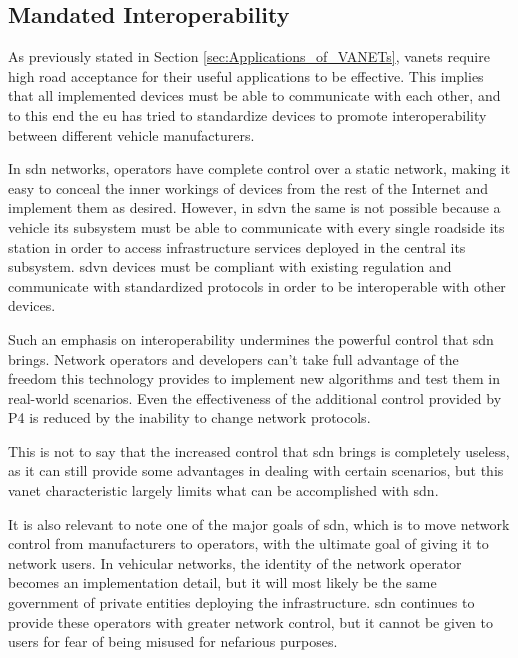 \subsection{Mandated Interoperability}
\label{subsub:mandated_interoperability}

As previously stated in Section \ref{sec:Applications_of_VANETs}, \glspl{vanet} require high road acceptance for their useful applications to be effective. This implies that all implemented devices must be able to communicate with each other, and to this end the \gls{eu} has tried to standardize devices to promote interoperability between different vehicle manufacturers.

In \gls{sdn} networks, operators have complete control over a static network, making it easy to conceal the inner workings of devices from the rest of the Internet and implement them as desired. However, in \gls{sdvn} the same is not possible because a vehicle \gls{its} subsystem must be able to communicate with every single roadside \gls{its} station in order to access infrastructure services deployed in the central \gls{its} subsystem. \gls{sdvn} devices must be compliant with existing regulation and communicate with standardized protocols in order to be interoperable with other devices.

Such an emphasis on interoperability undermines the powerful control that \gls{sdn} brings. Network operators and developers can't take full advantage of the freedom this technology provides to implement new algorithms and test them in real-world scenarios. Even the effectiveness of the additional control provided by P4 is reduced by the inability to change network protocols.

This is not to say that the increased control that \gls{sdn} brings is completely useless, as it can still provide some advantages in dealing with certain scenarios, but this \gls{vanet} characteristic largely limits what can be accomplished with \gls{sdn}. 

It is also relevant to note one of the major goals of \gls{sdn}, which is to move network control from manufacturers to operators, with the ultimate goal of giving it to network users. In vehicular networks, the identity of the network operator becomes an implementation detail, but it will most likely be the same government of private entities deploying the infrastructure. \gls{sdn} continues to provide these operators with greater network control, but it cannot be given to users for fear of being misused for nefarious purposes.

